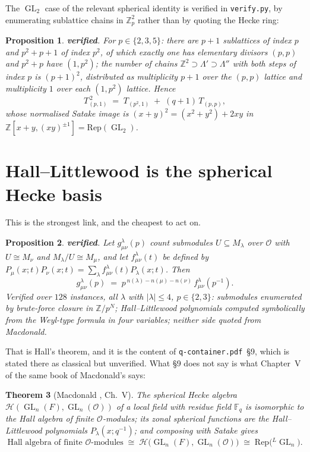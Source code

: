 \documentclass[11pt,a4paper]{article}
\newtheorem{theorem}{Theorem}[section]
\newtheorem{proposition}[theorem]{Proposition}
\theoremstyle{definition}
\theoremstyle{remark}
\newcommand{\FF}{\mathbb{F}}
\newcommand{\ZZ}{\mathbb{Z}}
\newcommand{\OO}{\mathcal{O}}
\newcommand{\Rep}{\mathrm{Rep}}
\newcommand{\dual}[1]{{}^{L}\!#1}
\DeclareMathOperator{\GL}{GL}
\newcommand{\OK}{\textcolor{okgreen}{\textbf{verified}}}
\begin{document}
The $\GL_2$ case of the relevant spherical identity is verified in
\texttt{verify.py}, by enumerating sublattice chains in $\ZZ_p^2$ rather than
by quoting the Hecke ring:

\begin{proposition}\label{prop:v3}
\OK. For $p \in \{2,3,5\}$: there are $p+1$ sublattices of index $p$ and
$p^2+p+1$ of index $p^2$, of which exactly one has elementary divisors $(p,p)$
and $p^2+p$ have $(1,p^2)$; the number of chains
$\ZZ^2 \supset \Lambda' \supset \Lambda''$ with both steps of index $p$ is
$(p+1)^2$, distributed as multiplicity $p+1$ over the $(p,p)$ lattice and
multiplicity $1$ over each $(1,p^2)$ lattice. Hence
\[
  T_{(p,1)}^{\,2} \;=\; T_{(p^2,1)} \;+\; (q+1)\, T_{(p,p)} ,
\]
whose normalised Satake image is $(x+y)^2 = (x^2+y^2) + 2xy$ in
$\ZZ[x+y,(xy)^{\pm 1}] = \Rep(\GL_2)$.
\end{proposition}

\section{Hall--Littlewood is the spherical Hecke basis}\label{sec:satake}

This is the strongest link, and the cheapest to act on.

\begin{proposition}\label{prop:v2}
\OK. Let $g^{\lambda}_{\mu\nu}(p)$ count submodules $U \subseteq M_\lambda$ over
$\OO$ with $U \cong M_\nu$ and $M_\lambda/U \cong M_\mu$, and let
$f^{\lambda}_{\mu\nu}(t)$ be defined by
$P_\mu(x;t)P_\nu(x;t) = \sum_\lambda f^{\lambda}_{\mu\nu}(t) P_\lambda(x;t)$.
Then
\[
  g^{\lambda}_{\mu\nu}(p)
  \;=\; p^{\,n(\lambda) - n(\mu) - n(\nu)}\, f^{\lambda}_{\mu\nu}(p^{-1}) .
\]
Verified over $128$ instances, all $\lambda$ with $|\lambda| \le 4$, $p \in
\{2,3\}$: submodules enumerated by brute-force closure in $\ZZ/p^N$;
Hall--Littlewood polynomials computed symbolically from the Weyl-type formula in
four variables; neither side quoted from Macdonald.
\end{proposition}

That is Hall's theorem, and it is the content of \texttt{q-container.pdf}~\S9,
which is stated there as classical but unverified. What \S9 does not say is
what Chapter~V of the same book of Macdonald's says:

\begin{theorem}[Macdonald \cite{Macdonald}, Ch.~V]\label{thm:chV}
The spherical Hecke algebra $\mathcal{H}(\GL_n(F), \GL_n(\OO))$ of a local field
with residue field $\FF_q$ is isomorphic to the Hall algebra of finite
$\OO$-modules; its zonal spherical functions are the Hall--Littlewood
polynomials $P_\lambda(x;q^{-1})$; and composing with Satake gives
\[
  \text{Hall algebra of finite } \OO\text{-modules}
  \;\cong\; \mathcal{H}\bigl(\GL_n(F),\GL_n(\OO)\bigr)
  \;\cong\; \Rep\bigl(\dual{\GL_n}\bigr) .
\]
\end{theorem}
\end{document}
